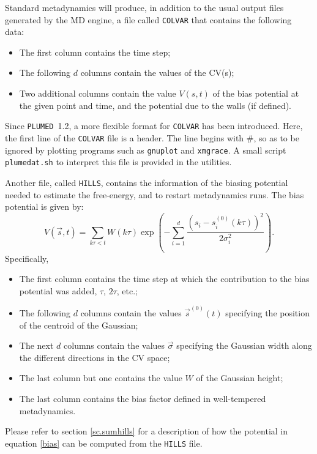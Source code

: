 \documentclass[12pt,fleqn]{report}
\newcommand{\plumed}{{\tt PLUMED}}
\begin{document}
Standard metadynamics will produce, in addition to the
usual output files generated by the MD engine, a file called {\tt COLVAR} that
contains the following data:
\begin{itemize}
\item The first column contains the time step;
\item The following $d$ columns contain 
the values of the CV(s);
\item Two additional columns contain the value $V(s,t)$ of the bias
potential at the given point and time, and the potential due to the 
walls (if defined).
\end{itemize}
Since \plumed\ 1.2, a more flexible format for {\tt COLVAR} has been introduced. Here, the first line
of the {\tt COLVAR} file is a header. The line begins with \#, so as to be ignored by plotting
programs such as {\tt gnuplot} and {\tt xmgrace}. A small script
{\tt plumedat.sh} to interpret this file is provided
in the utilities.

Another file, called {\tt HILLS}, contains the information of the biasing
potential needed to estimate the free-energy, and to restart metadynamics runs. 
The bias potential is given by:
\begin{equation}\label{bias}
V(\vec{s},t) = \sum_{ k \tau < t} W(k \tau)
\exp\left(
-\sum_{i=1}^{d} \frac{(s_i-s_i^{(0)}(k \tau))^2}{2\sigma_i^2}
\right).
\end{equation}
Specifically,
\begin{itemize}
\item The first column contains the time step at which the contribution to the bias potential
was added, $\tau$, $2\tau$, etc.;
\item The following $d$ columns contain the values $\vec{s}^{(0)}(t)$ 
specifying the position of the centroid of the Gaussian;
\item The next $d$ columns contain the  values $\vec{\sigma}$  specifying the 
Gaussian width  along the different directions in the CV space;
\item The last  column but one contains the value $W$ of the Gaussian height;
\item The last column contains the bias factor defined in well-tempered metadynamics.
\end{itemize}

Please refer to section \ref{sc.sumhills} for a description of how the potential
in equation \ref{bias} can be computed from the {\tt HILLS} file.
\end{document}
